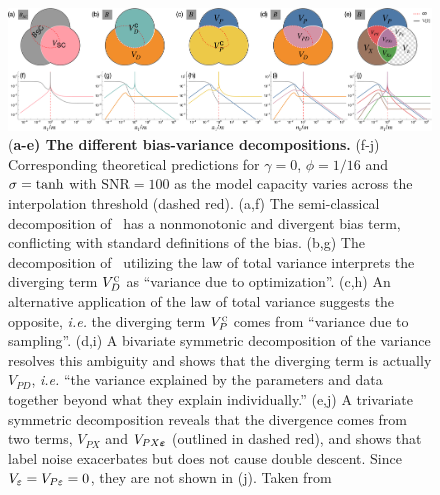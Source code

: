 \documentclass[10pt]{article} %
\begin{document}
\begin{figure}[htb]
    \centering
\includegraphics[width=\linewidth]{pdf/VennFig2.pdf}
\caption{(\textbf{a-e) The different bias-variance decompositions.} (f-j) Corresponding theoretical predictions for $\gamma =0$, $\phi=1/16$ and $\sigma = \tanh$ with $\text{SNR} = 100$ as the model capacity varies across the interpolation threshold (dashed red). (a,f) The semi-classical decomposition of~\cite{hastie2019surprises,mei2019generalization} has a nonmonotonic and divergent bias term, conflicting with standard definitions of the bias. (b,g) The decomposition of~\cite{neal2018modern} utilizing the law of total variance interprets the diverging term $V_D^\textsc{c}$ as ``variance due to optimization''. (c,h) An alternative application of the law of total variance suggests the opposite, \emph{i.e.} the diverging term $V_P^\textsc{c}$ comes from ``variance due to sampling''. (d,i) A bivariate symmetric decomposition of the variance resolves this ambiguity and shows that the diverging term is actually $V_{PD}$, \emph{i.e.} ``the variance explained by the parameters and data together beyond what they explain individually.'' (e,j) A trivariate symmetric decomposition reveals that the divergence comes from two terms, $V_{PX}$ and $V_{PX\boldsymbol{\varepsilon}}$ (outlined in dashed red), and shows that label noise exacerbates but does not cause double descent. Since $V_{\varepsilon}=V_{P{\varepsilon}}=0$, they are not shown in (j). Taken from \cite{adlam2020understandingdoubledescentrequires}}
\label{fig:venn_variance}
\end{figure}
\end{document}
